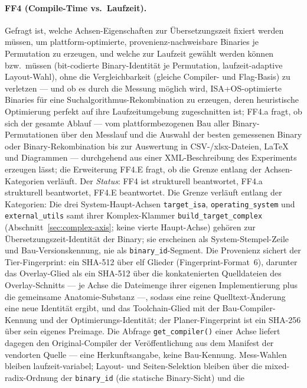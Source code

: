 \begin{nurlang}
\paragraph{FF4 (Compile-Time vs.\ Laufzeit).} Gefragt ist, welche Achsen-Eigenschaften zur
Übersetzungszeit fixiert werden müssen, um plattform-optimierte, provenienz-nachweisbare Binaries je
Permutation zu erzeugen, und welche zur Laufzeit gewählt werden können bzw.\ müssen (bit-codierte
Binary-Identität je Permutation, laufzeit-adaptive Layout-Wahl), ohne die Vergleichbarkeit (gleiche
Compiler- und Flag-Basis) zu verletzen --- und ob es durch die Messung möglich wird, ISA+OS-optimierte
Binaries für eine Suchalgorithmus-Rekombination zu erzeugen, deren heuristische Optimierung perfekt
auf ihre Laufzeitumgebung zugeschnitten ist; FF4.a fragt, ob sich der gesamte Ablauf --- vom
plattformbezogenen Bau aller Binary-Permutationen über den Messlauf und die Auswahl der besten
gemessenen Binary oder Binary-Rekombination bis zur Auswertung in CSV-/xlsx-Dateien, LaTeX und
Diagrammen --- durchgehend aus einer XML-Beschreibung des Experiments erzeugen lässt; die Erweiterung
FF4.E fragt, ob die Grenze entlang der Achsen-Kategorien verläuft.
Der \emph{Status}: FF4 ist strukturell beantwortet, FF4.a strukturell beantwortet, FF4.E beantwortet. Die Grenze verläuft entlang der
Kategorien: Die drei System-Haupt-Achsen \texttt{target\_isa}, \texttt{operating\_system} und
\texttt{external\_utils} samt ihrer Komplex-Klammer \texttt{build\_target\_complex}
(Abschnitt~\ref{sec:complex-axis}; keine vierte Haupt-Achse) gehören zur Übersetzungszeit-Identität
der Binary; sie erscheinen als System-Stempel-Zeile und Bau-Versionskennung, nie als
\texttt{binary\_id}-Segment. Die Provenienz sichert der Tier-Fingerprint: ein SHA-512 über elf Glieder
(Fingerprint-Format~6), darunter das Overlay-Glied als ein SHA-512 über die konkatenierten Quelldateien
des Overlay-Schnitts --- je Achse die Dateimenge ihrer eigenen Implementierung plus die gemeinsame
Anatomie-Substanz ---, sodass eine reine Quelltext-Änderung eine neue Identität ergibt, und das
Toolchain-Glied mit der Bau-Compiler-Kennung und der Optimierungs-Identität; der Planer-Fingerprint ist
ein SHA-256 über sein eigenes Preimage. Die Abfrage \texttt{get\_compiler()} einer Achse liefert
dagegen den Original-Compiler der Veröffentlichung aus dem Manifest der vendorten Quelle --- eine
Herkunftsangabe, keine Bau-Kennung. Mess-Wahlen bleiben laufzeit-variabel; Layout- und Seiten-Selektion
bleiben über die mixed-radix-Ordnung der \texttt{binary\_id} (die statische Binary-Sicht) und die

\end{nurlang}
